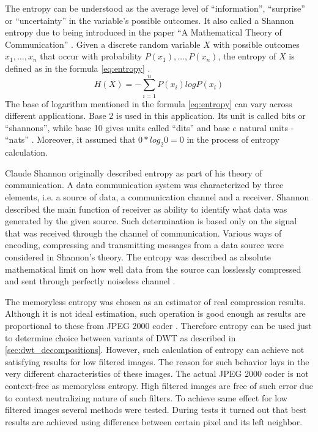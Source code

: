 The entropy can be understood as the average level of ``information'', ``surprise'' or ``uncertainty'' in the variable's
possible outcomes. It also called a Shannon entropy due to being introduced in the paper ``A Mathematical Theory of Communication'' \cite{entropy_wiki}.
Given a discrete random variable $X$ with possible outcomes $x_{1},\dots,x_{n}$ that occur with probability
$P(x_{1}),\dots,P(x_{n})$, the entropy of $X$ is defined as in the formula \ref{eq:entropy} \cite{entropy}.
\begin{equation}
    H(X)=-\sum_{i=1}^{n}P(x_{i})logP(x_{i})
\label{eq:entropy}
\end{equation}
The base of logarithm mentioned in the formula \ref{eq:entropy} can vary across different applications. Base 2 is used
in this application. Its unit is called bits or ``shannons'', while base 10 gives units called ``dits'' and base $e$
natural units - ``nats'' \cite{entropy_wiki}. Moreover, it assumed that $0*log_{2}0=0$ in the process of entropy calculation.

Claude Shannon originally described entropy as part of his theory of communication. A data communication system
was characterized by three elements, i.e. a source of data, a communication channel and a receiver. Shannon described
the main function of receiver as ability to identify what data was generated by the given source. Such determination
is based only on the signal that was received through the channel of communication. Various ways of encoding,
compressing and transmitting messages from a data source were considered in Shannon's theory. The entropy was described
as absolute mathematical limit on how well data from the source can losslessly compressed and sent through perfectly
noiseless channel \cite{entropy_wiki}.

The memoryless entropy was chosen as an estimator of real compression results. Although it is not ideal estimation,
such operation is good enough as results are proportional to these from JPEG 2000 coder \cite{entropy}.
Therefore entropy can be used just to determine choice between variants of DWT as described in \ref{sec:dwt_decompositions}.
However, such calculation of entropy can achieve not satisfying results for low filtered images.
The reason for such behavior lays in the very different characteristics of these images. The actual JPEG 2000 coder
is not context-free as memoryless entropy. High filtered images are free of such error due to context neutralizing
nature of such filters. To achieve same effect for low filtered images several methods were tested.
During tests it turned out that best results are achieved using difference between certain pixel and its left neighbor.

